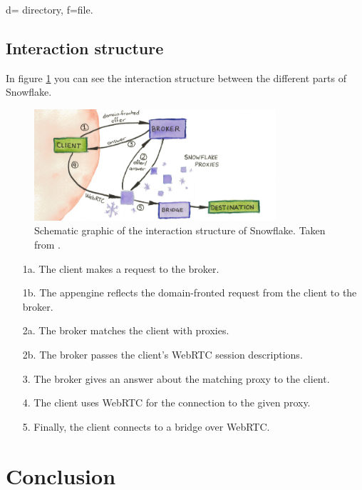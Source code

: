 \documentclass{amsart}
\theoremstyle{definition}
\theoremstyle{remark}
\numberwithin{equation}{section}
\begin{document}
d= directory, f=file.
\subsection{Interaction structure}
\label{ss:interactionstructure}
In figure \ref{fig:interactionstructure} you can see the interaction structure between the different parts of Snowflake.

\begin{figure}[H]
\centering
    \includegraphics[width=0.8\textwidth]{images/snowflake-schematic.png}
\caption{Schematic graphic of the interaction structure of Snowflake. Taken from \cite{SnowflakeSchematic}.}
\label{fig:interactionstructure}
\end{figure}

\begin{itemize}
    \item [1a.] The client makes a request to the broker.
    \item [1b.] The appengine reflects the domain-fronted request from the client to the broker.
    \item [2a.] The broker matches the client with proxies.
    \item [2b.] The broker passes the client's WebRTC session descriptions.
    \item [3.] The broker gives an answer about the matching proxy to the client.
    \item [4.] The client uses WebRTC for the connection to the given proxy.
    \item [5.] Finally, the client connects to a bridge over WebRTC.
\end{itemize}
\section{Conclusion}
\label{s:conclusion}
\nocite{*}
%


\end{document}
